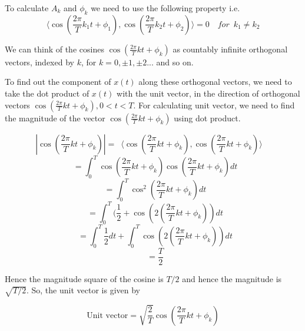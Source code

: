 \noindent
To calculate $A_k$ and $\phi_k$ we need to use the following property i.e.
\begin{equation*}
\langle \cos (\frac{2\pi}{T}k_1t + \phi_1), \cos (\frac{2\pi}{T}k_2t + \phi_2) \rangle = 0 \enspace \enspace		for \enspace k_1 \neq k_2 \end{equation*}

\noindent
We can think of the cosines $\cos (\frac{2\pi}{T}kt + \phi_k)$ as countably infinite orthogonal vectors, indexed by $k$, for $k=0, \pm1, \pm2...$ and so on.

\noindent
To find out the component of $x(t)$ along these orthogonal vectors, we need to take the dot product of $x(t)$ with the unit vector, in the direction of orthogonal vectors $\cos(\frac{2\pi}{T}kt + \phi_k), 0<t<T$.
For calculating unit vector, we need to find the magnitude of the vector $\cos(\frac{2\pi}{T}kt + \phi_k)$ using dot product.

\begin{equation*} \left|\cos(\frac{2\pi}{T}kt + \phi_k)\right| = \enspace 
\langle \cos (\frac{2\pi}{T}kt + \phi_k), \cos (\frac{2\pi}{T}kt + \phi_k)\rangle  \enspace \enspace	\end{equation*}
\begin{equation*} \enspace = \int_{0}^{T}  \cos (\frac{2\pi}{T}kt + \phi_k) \cos (\frac{2\pi}{T}kt + \phi_k) dt\end{equation*}
\begin{equation*} \enspace = \int_{0}^{T}  \cos^2 (\frac{2\pi}{T}kt + \phi_k) dt \end{equation*}
\begin{equation*} \enspace = \int_{0}^{T} (\frac{1}{2} + \cos (2(\frac{2\pi}{T}kt + \phi_k)) dt\end{equation*}
\begin{equation*} \enspace = \int_{0}^{T} \frac{1}{2} dt + \int_{0}^{T} \cos (2(\frac{2\pi}{T}kt + \phi_k)) dt\end{equation*}
\begin{equation*} \enspace = \frac{T}{2} \end{equation*}


\noindent
Hence the magnitude square of the cosine is $T/2$ and hence the magnitude is $\sqrt{T/2}$. So, the unit vector is given by

\begin{equation*} \textrm{Unit vector} = \sqrt{\frac{2}{T}}\cos (\frac{2\pi}{T}kt + \phi_k)\end{equation*}
                    
